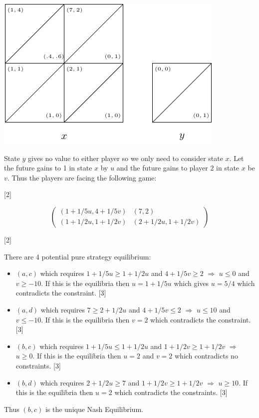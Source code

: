 \documentclass[12pt,a4paper]{article}
\makeatletter
\renewcommand{\@oddfoot}{\hfil \arabic{page} \hfil}    %
\makeatother
\begin{document}
\begin{enumerate}
\begin{enumerate}
        \begin{center}
            \includegraphics[width=.8\textwidth]{images/mock-img04.pdf}
        \end{center}

        State \(y\) gives no value to either player so we only need to consider state \(x\). Let the future gains to 1 in state \(x\) by \(u\) and the future gains to player 2 in state \(x\) be \(v\). Thus the players are facing the following game:

        \hfill[2]

        \[\begin{pmatrix}
        (1+1/5u,4+1/5v)&(7,2)\\
        (1+1/2u,1+1/2v)&(2+1/2u,1+1/2v)
        \end{pmatrix}\]

        \hfill[2]

        There are 4 potential pure strategy equilibrium:

        \begin{itemize}
            \item \((a,c)\) which requires \(1+1/5u\geq1+1/2u\) and \(4+1/5v\geq2\) \(\Rightarrow\) \(u\leq 0\) and \(v\geq -10\). If this is the equilibria then \(u=1+1/5u\) which gives \(u=5/4\) which contradicts the constraint.
            \hfill[3]
            \item \((a,d)\) which requires \(7\geq2+1/2u\) and \(4+1/5v\leq2\) \(\Rightarrow\) \(u\leq 10\) and \(v\leq -10\). If this is the equilibria then \(v=2\) which contradicts the constraint.
            \hfill[3]
            \item \((b,c)\) which requires \(1+1/5u\leq1+1/2u\) and \(1+1/2v\geq1+1/2v\) \(\Rightarrow\) \(u\geq 0\). If this is the equilibria then \(u=2\) and \(v=2\) which contradicts no constraints.
            \hfill[3]
            \item \((b,d)\) which requires \(2+1/2u\geq 7\) and \(1+1/2v\geq1+1/2v\) \(\Rightarrow\) \(u\geq 10\). If this is the equilibria then \(u=2\) which contradicts the constraints.
            \hfill[3]
        \end{itemize}

        Thus \((b,c)\) is the unique Nash Equilibrium.


    \end{enumerate}
\end{enumerate}


\makeatletter
\renewcommand{\@oddfoot}{\hfil \arabic{page}X \hfil}    %
\makeatother
\end{document}

